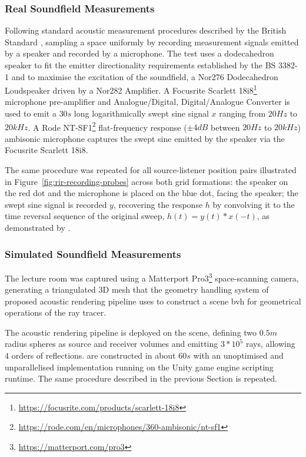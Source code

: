 \subsubsection{Real Soundfield Measurements}
\label{sec:real_soundfield_measurement}
Following standard acoustic measurement procedures described by the British Standard \citep{bs3382-1}, sampling a space uniformly by recording measurement signals emitted by a speaker and recorded by a microphone. The test uses a dodecahedron speaker to fit the emitter directionality requirements established by the BS 3382-1 and to maximise the excitation of the soundfield, a Nor276 Dodecahedron Loudspeaker driven by a Nor282 Amplifier. A Focusrite Scarlett 18i8\footnote{\url{https://focusrite.com/products/scarlett-18i8}} microphone pre-amplifier and Analogue/Digital, Digital/Analogue Converter is used to emit a $30s$ long logarithmically swept sine signal $x$ ranging from $20Hz$ to $20kHz$. A Rode NT-SF1\footnote{\url{https://rode.com/en/microphones/360-ambisonic/nt-sf1}} flat-frequency response ($\pm4dB$ between $20Hz$ to $20kHz$) ambisonic microphone captures the swept sine emitted by the speaker via the Focusrite Scarlett 18i8. \par
The same procedure was repeated for all source-listener position pairs illustrated in Figure~\ref{fig:rir-recording-probes} across both grid formations: the speaker on the red dot and the microphone is placed on the blue dot, facing the speaker; the swept sine signal is recorded $y$, recovering the response $h$ by convolving it to the time reversal sequence of the original sweep, $h(t) = y(t) * x(-t)$, as demonstrated by \cite{farina07}. \par

\subsubsection{Simulated Soundfield Measurements}
The lecture room was captured using a Matterport Pro3\footnote{\url{https://matterport.com/pro3}} space-scanning camera, generating a triangulated 3D mesh that the geometry handling system of proposed acoustic rendering pipeline uses to construct a scene \acrshort{bvh} for geometrical operations of the ray tracer.\par
The acoustic rendering pipeline is deployed on the scene, defining two $0.5m$ radius spheres as source and receiver volumes and emitting $3*10^5$ rays, allowing $4$ orders of reflections.  are constructed in about $60s$ with an unoptimised and unparallelised implementation running on the Unity game engine scripting runtime. The same procedure described in the previous Section is repeated. \par

